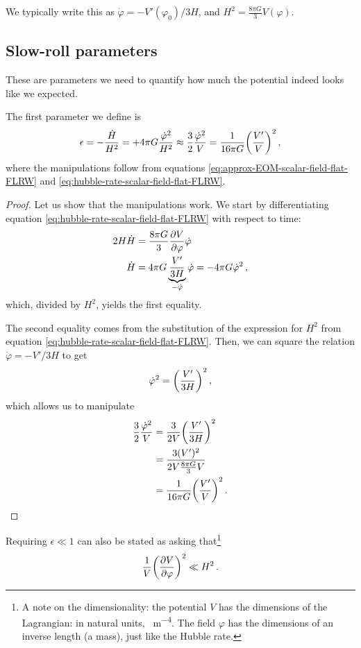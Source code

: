 \documentclass[main.tex]{subfiles}
\begin{document}
We typically write this as \(\dot{\varphi} = - V' (\varphi_0 ) / 3H\), and \(H^2 = \frac{8 \pi G}{3} V(\varphi )\). 

\subsection{Slow-roll parameters}

These are parameters we need to quantify how much the potential indeed looks like we expected. 

The first parameter we define is
%
\begin{align}
\epsilon 
= - \frac{\dot{H}}{H^2} = 
+ 4 \pi G \frac{\dot{\varphi}^2}{H^2} \approx \frac{3}{2} \frac{\dot{\varphi}^2}{V} = \frac{1}{16 \pi G} \qty(\frac{V'}{V})^2
\,,
\end{align}
%
where the manipulations follow from equations \eqref{eq:approx-EOM-scalar-field-flat-FLRW} and \eqref{eq:hubble-rate-scalar-field-flat-FLRW}.

\begin{proof}
Let us show that the manipulations work. We start by differentiating equation \eqref{eq:hubble-rate-scalar-field-flat-FLRW} with respect to time: 
%
\begin{align}
2 H \dot{H} &= \frac{8 \pi G}{3} \pdv{V}{\varphi } \dot{\varphi}  \\
\dot{H} &= 4 \pi G \underbrace{\frac{V'}{3 H}}_{- \dot{\varphi}} \dot{\varphi} = - 4 \pi G \dot{\varphi}^2
\,,
\end{align}
%
which, divided by \(H^2\), yields the first equality. 

The second equality comes from the substitution of the expression for \(H^2\) from equation \eqref{eq:hubble-rate-scalar-field-flat-FLRW}. 
Then, we can square the relation \(\dot{\varphi} = - V' / 3 H\) to get 
%
\begin{align}
\dot{\varphi}^2 = \qty(\frac{V'}{3H})^2
\,,
\end{align}
%
which allows us to manipulate 
%
\begin{align}
\frac{3}{2} \frac{\dot{\varphi}^2}{V} &= \frac{3}{2V} \qty(\frac{V'}{3H})^2  \\
&= \frac{3 (V')^2}{2V \frac{8 \pi G}{3} V}  \\
&= \frac{1}{16 \pi G} \qty( \frac{V'}{V})^2
\,.
\end{align}
\end{proof}

Requiring \(\epsilon \ll 1\) can also be stated as asking that\footnote{A note on the dimensionality: the potential \(V\) has the dimensions of the Lagrangian: in natural units, \SI{}{m^{-4}}. The field \(\varphi \) has the dimensions of an inverse length (a mass), just like the Hubble rate.}
%
\begin{align}
\frac{1}{V} \qty(\pdv{V}{\varphi })^2 \ll H^2
\,.
\end{align}
\end{document}
